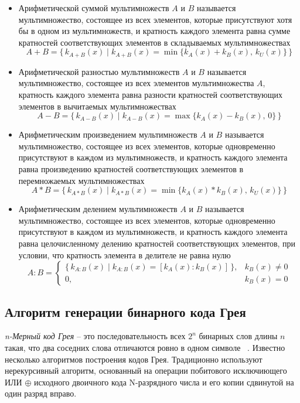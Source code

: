 \documentclass[14pt,a4paper]{extreport}
\begin{document}
\begin{itemize}
    \item Арифметической суммой мультимножеств \(A\) и \(B\) называется мультимножество, состоящее из всех элементов, которые присутствуют хотя бы в одном из мультимножеств, и кратность каждого элемента равна сумме кратностей соответствующих элементов в складываемых мультимножествах
    $$A + B = \{\, k_{A+B}(x) \mid k_{A+B}(x) = \min\{k_A(x) + k_B(x),\, k_U(x)\} \,\}$$
    \item Арифметической разностью мультимножеств \(A\) и \(B\) называется мультимножество, состоящее из всех элементов мультимножества \(A\), кратность каждого элемента равна разности кратностей соответствующих элементов в вычитаемых мультимножествах
    $$ A - B = \{\, k_{A-B}(x) \mid k_{A-B}(x) = \max\{k_A(x) - k_B(x),\, 0\} \,\} $$
    \item Арифметическим произведением мультимножеств \(A\) и \(B\) называется мультимножество, состоящее из всех элементов, которые одновременно присутствуют в каждом из мультимножеств, и кратность каждого элемента равна произведению кратностей соответствующих элементов в перемножаемых мультимножествах
    $$A * B = \{\, k_{A*B}(x) \mid k_{A*B}(x) = \min\{k_A(x) * k_B(x),\, k_U(x)\} \,\}$$
    \item Арифметическим делением мультимножеств \(A\) и \(B\) называется мультимножество, состоящее из всех элементов, которые одновременно присутствуют в каждом из мультимножеств, и кратность каждого элемента равна целочисленному делению кратностей соответствующих элементов, при условии, что кратность элемента в делителе не равна нулю
    \[
        A : B = 
        \begin{cases} 
            \{\, k_{A:B}(x) \mid k_{A:B}(x) = [k_A(x) : k_B(x)] \,\}, & k_B(x) \neq 0 \\ 
            0, & k_B(x) = 0 
        \end{cases}
    \]
\end{itemize}

\subsection{Алгоритм генерации бинарного кода Грея}

\emph{n-Мерный код Грея} -- это последовательность всех $2^n$ бинарных слов длины $n$ такая, что два соседних слова отличаются ровно в одном символе ~\cite{knuth1}. 
Известно несколько алгоритмов построения кодов Грея. Традиционно используют нерекурсивный алгоритм, основанный на операции побитового исключиющего ИЛИ $\oplus$ исходного двоичного кода N-разрядного числа и его копии сдвинутой на один разряд вправо.
\end{document}
